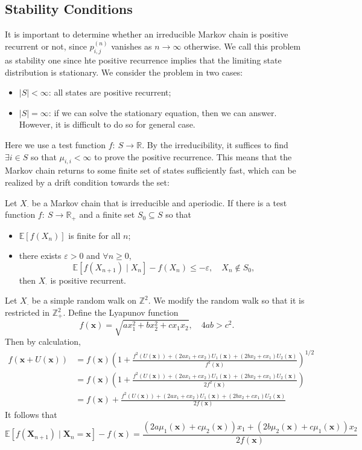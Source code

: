 \subsection{Stability Conditions}
It is important to determine whether an irreducible Markov chain is positive recurrent or not,  since $p_{i,j}^{(n)}$ vanishes as $n\to\infty$ otherwise.
We call this problem as stability one since hte positive recurrence implies that the limiting state distribution is stationary.
We consider the problem in two cases:
\begin{itemize}
\item
$|S|<\infty$: all states are positive recurrent;
\item
$|S|=\infty$: if we can solve the stationary equation, then we can answer.
However, it is difficult to do so for general case.
\end{itemize}
Here we use a test function $f:~S\to\mathbb{R}$.
By the irreducibility, it suffices to find $\exists i\in S$ so that $\mu_{i,i}<\infty$ to prove the positive recurrence.
This means that the Markov chain returns to some finite set of states sufficiently fast,
which can be realized by a drift condition towards the set:

\begin{theorem}
Let $X_{\cdot}$ be a Markov chain that is irreducible and aperiodic.
If there is a test function $f:~S\to\mathbb{R}_+$ and a finite set $S_0\subseteq S$ so that
\begin{itemize}
\item
$\mathbb{E}[f(X_n)]$ is finite for all $n$;
\item
there exists $\varepsilon>0$ and $\forall n\ge0$,
\[
\mathbb{E}[f(X_{n+1})\mid X_n]-f(X_n)\le-\varepsilon,\quad X_n\notin S_0,
\]
then $X_{\cdot}$ is positive recurrent.
\end{itemize}
\end{theorem}

\begin{example}
Let $X_{\cdot}$ be a simple random walk on $\mathbb{Z}^2$.
We modify the random walk so that it is restricted in $\mathbb{Z}_+^2$.
Define the Lyapunov function
\[
f(\bm x)=\sqrt{ax_1^2+bx_2^2+cx_1x_2},\quad 4ab>c^2.
\]
Then by calculation,
\begin{align*}
f(\bm x+U(\bm x))&=
f(\bm x)\left(
1+\frac{f^2(U(\bm x)) + (2ax_1+cx_2)U_1(\bm x) + (2bx_2+cx_1)U_2(\bm x)}{f^2(\bm x)}
\right)^{1/2}\\
&=f(\bm x)\left(
1+\frac{f^2(U(\bm x)) + (2ax_1+cx_2)U_1(\bm x) + (2bx_2+cx_1)U_2(\bm x)}{2f^2(\bm x)}
\right)\\
&=f(\bm x) + \frac{f^2(U(\bm x)) + (2ax_1+cx_2)U_1(\bm x) + (2bx_2+cx_1)U_2(\bm x)}{2f(\bm x)}
\end{align*}
It follows that
\[
\mathbb{E}[f(\bm X_{n+1})\mid \bm X_n=\bm x]-f(\bm x)=
\frac{(2a\mu_1(\bm x) + c\mu_2(\bm x))x_1 + (2b\mu_2(\bm x) + c\mu_1(\bm x))x_2}{2f(\bm x)}
\]
\end{example}

